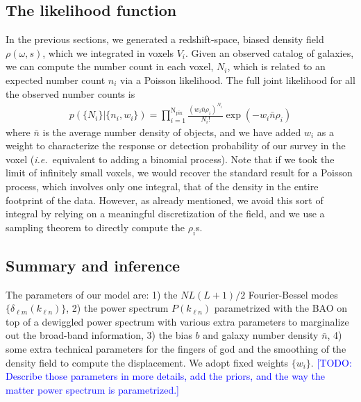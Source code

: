 \documentclass{aastex6}
\newcommand{\ie}{{\textit{i.e.}~}}
\newcommand{\eqn}[1]{\begin{eqnarray}#1\end{eqnarray}}
\newcommand{\todo}[1]{\textcolor{blue}{[TODO: #1]}}
\begin{document}
\subsection{The likelihood function}

In the previous sections, we generated a redshift-space, biased density field $\rho(\omega, s)$, which we integrated in voxels $V_i$.
Given an observed catalog of galaxies, we can compute the number count in each voxel, $N_i$, which is related to an expected number count $n_i$ via a Poisson likelihood. 
The full joint likelihood for all the observed number counts is
\eqn{
	p( \{N_i\} |\{ n_i , w_i\}) = \prod_{i=1}^{\mathrm{N}_\mathrm{pix}} \frac{(w_i \bar{n} \rho_i)^{N_i}}{N_i!} \exp(-w_i \bar{n} \rho_i) 
}
where  $\bar{n}$ is the average number density of objects, and we have added $w_i$ as a weight to characterize the response or detection probability of our survey in the voxel (\ie equivalent to adding a binomial process).
Note that if we took the limit of infinitely small voxels, we would recover the standard result for a Poisson process, which involves only one integral, that of the density in the entire footprint of the data.
However, as already mentioned, we avoid this sort of integral by relying on a meaningful discretization of the field, and we use a sampling theorem to directly compute the $\rho_i$s.




\newpage
\subsection{Summary and inference}

The parameters of our model are: 1) the $NL(L+1)/2$ Fourier-Bessel modes $\{\delta_{\ell m}(k_{\ell n})\}$, 2) the power spectrum $P(k_{\ell n})$ parametrized with the BAO on top of a dewiggled power spectrum with various extra parameters to marginalize out the broad-band information, 3) the bias $b$ and galaxy number density $\bar{n}$, 4) some extra technical parameters for the fingers of god and the smoothing of the density field to compute the displacement.
We adopt fixed weights $\{ w_i \}$.
\todo{Describe those parameters in more details, add the priors, and the way the matter power spectrum is parametrized.}
\end{document}
